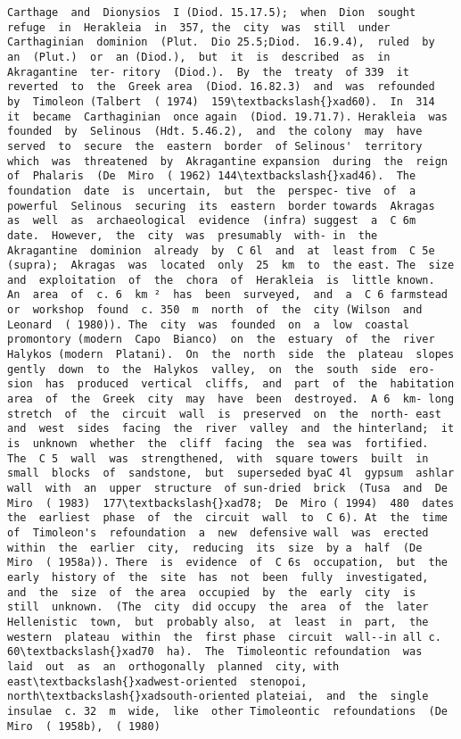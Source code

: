 \documentclass[11pt]{article}
\begin{document}
\begin{Verbatim}[commandchars=\\\{\}]
Carthage  and  Dionysios  I (Diod. 15.17.5);  when  Dion  sought  refuge  in  Herakleia  in  357, the  city  was  still  under  Carthaginian  dominion  (Plut.  Dio 25.5;Diod.  16.9.4),  ruled  by  an  (Plut.)  or  an (Diod.),  but  it  is  described  as  in  Akragantine  ter- ritory  (Diod.).  By  the  treaty  of 339  it  reverted  to  the  Greek area  (Diod. 16.82.3)  and  was  refounded  by  Timoleon (Talbert  ( 1974)  159\textbackslash{}xad60).  In  314  it  became  Carthaginian  once again  (Diod. 19.71.7). Herakleia  was  founded  by  Selinous  (Hdt. 5.46.2),  and  the colony  may  have  served  to  secure  the  eastern  border  of Selinous'  territory  which  was  threatened  by  Akragantine expansion  during  the  reign  of  Phalaris  (De  Miro  ( 1962) 144\textbackslash{}xad46).  The  foundation  date  is  uncertain,  but  the  perspec- tive  of  a  powerful  Selinous  securing  its  eastern  border towards  Akragas  as  well  as  archaeological  evidence  (infra) suggest  a  C 6m  date.  However,  the  city  was  presumably  with- in  the  Akragantine  dominion  already  by  C 6l  and  at  least from  C 5e  (supra);  Akragas  was  located  only  25  km  to  the east. The  size  and  exploitation  of  the  chora  of  Herakleia  is  little known.  An  area  of  c. 6  km ²  has  been  surveyed,  and  a  C 6 farmstead  or  workshop  found  c. 350  m  north  of  the  city (Wilson  and  Leonard  ( 1980)). The  city  was  founded  on  a  low  coastal  promontory (modern  Capo  Bianco)  on  the  estuary  of  the  river  Halykos (modern  Platani).  On  the  north  side  the  plateau  slopes gently  down  to  the  Halykos  valley,  on  the  south  side  ero- sion  has  produced  vertical  cliffs,  and  part  of  the  habitation area  of  the  Greek  city  may  have  been  destroyed.  A 6  km- long  stretch  of  the  circuit  wall  is  preserved  on  the  north- east  and  west  sides  facing  the  river  valley  and  the hinterland;  it  is  unknown  whether  the  cliff  facing  the  sea was  fortified.  The  C 5  wall  was  strengthened,  with  square towers  built  in  small  blocks  of  sandstone,  but  superseded byaC 4l  gypsum  ashlar  wall  with  an  upper  structure  of sun-dried  brick  (Tusa  and  De  Miro  ( 1983)  177\textbackslash{}xad78;  De  Miro ( 1994)  480  dates  the  earliest  phase  of  the  circuit  wall  to  C 6). At  the  time  of  Timoleon's  refoundation  a  new  defensive wall  was  erected  within  the  earlier  city,  reducing  its  size  by a  half  (De  Miro  ( 1958a)). There  is  evidence  of  C 6s  occupation,  but  the  early  history of  the  site  has  not  been  fully  investigated,  and  the  size  of  the area  occupied  by  the  early  city  is  still  unknown.  (The  city  did occupy  the  area  of  the  later  Hellenistic  town,  but  probably also,  at  least  in  part,  the  western  plateau  within  the  first phase  circuit  wall--in all c. 60\textbackslash{}xad70  ha).  The  Timoleontic refoundation  was  laid  out  as  an  orthogonally  planned  city, with  east\textbackslash{}xadwest-oriented  stenopoi,  north\textbackslash{}xadsouth-oriented plateiai,  and  the  single  insulae  c. 32  m  wide,  like  other Timoleontic  refoundations  (De  Miro  ( 1958b),  ( 1980) 
\end{Verbatim}
\end{document}
